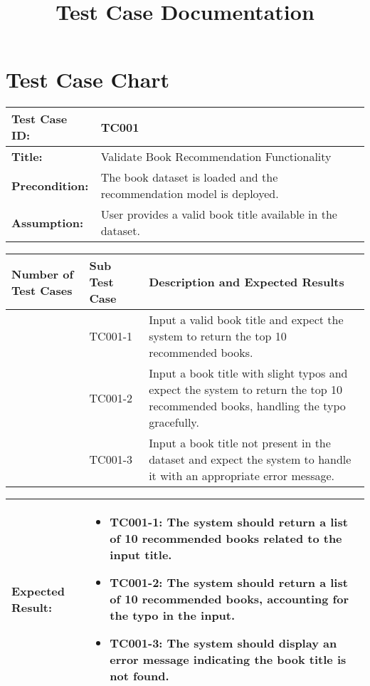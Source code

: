 \documentclass{article}
\title{Test Case Documentation}
\date{}
\begin{document}
\maketitle

\section*{Test Case Chart}

\noindent
\begin{tabularx}{\textwidth}{|>{\raggedright\arraybackslash}p{4cm}|X|}
    \hline
    \textbf{Test Case ID:} & TC001 \\ \hline
    \textbf{Title:} & Validate Book Recommendation Functionality \\ \hline
    \textbf{Precondition:} & The book dataset is loaded and the recommendation model is deployed. \\ \hline
    \textbf{Assumption:} & User provides a valid book title available in the dataset. \\ \hline
\end{tabularx}

\noindent
\begin{tabularx}{\textwidth}{|>{\centering\arraybackslash}p{3cm}|>{\centering\arraybackslash}p{3cm}|X|}
    \hline
    \textbf{Number of Test Cases} & \textbf{Sub Test Case} & \textbf{Description and Expected Results} \\ \hline
    1 & TC001-1 & Input a valid book title and expect the system to return the top 10 recommended books. \\ \hline
    2 & TC001-2 & Input a book title with slight typos and expect the system to return the top 10 recommended books, handling the typo gracefully. \\ \hline
    3 & TC001-3 & Input a book title not present in the dataset and expect the system to handle it with an appropriate error message. \\ \hline
\end{tabularx}

\noindent
\begin{tabularx}{\textwidth}{|>{\raggedright\arraybackslash}p{4cm}|X|}
    \hline
    \textbf{Expected Result:} & 
    \begin{itemize}
        \item TC001-1: The system should return a list of 10 recommended books related to the input title.
        \item TC001-2: The system should return a list of 10 recommended books, accounting for the typo in the input.
        \item TC001-3: The system should display an error message indicating the book title is not found.
    \end{itemize}
    \\ \hline
\end{tabularx}
\end{document}
